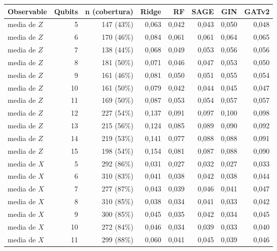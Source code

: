 \begin{table}[htbp]
    \centering
    {\footnotesize
    \begin{tabular}{@{}lrrrrrrr@{}}
        \toprule
        \textbf{Observable} & \textbf{Qubits} & \textbf{n (cobertura)} & \textbf{Ridge} & \textbf{RF} & \textbf{SAGE} & \textbf{GIN} & \textbf{GATv2} \\
        \midrule
        media de $Z$ & 5 & 147 (43\%) & 0,063 & 0,042 & 0,043 & 0,050 & 0,048 \\
        media de $Z$ & 6 & 170 (46\%) & 0,084 & 0,061 & 0,061 & 0,064 & 0,065 \\
        media de $Z$ & 7 & 138 (44\%) & 0,068 & 0,049 & 0,053 & 0,056 & 0,056 \\
        media de $Z$ & 8 & 181 (50\%) & 0,071 & 0,046 & 0,047 & 0,053 & 0,050 \\
        media de $Z$ & 9 & 161 (46\%) & 0,081 & 0,050 & 0,051 & 0,055 & 0,054 \\
        media de $Z$ & 10 & 161 (50\%) & 0,079 & 0,042 & 0,044 & 0,045 & 0,047 \\
        media de $Z$ & 11 & 169 (50\%) & 0,087 & 0,053 & 0,054 & 0,057 & 0,057 \\
        media de $Z$ & 12 & 227 (54\%) & 0,137 & 0,091 & 0,097 & 0,100 & 0,098 \\
        media de $Z$ & 13 & 215 (56\%) & 0,124 & 0,085 & 0,089 & 0,090 & 0,092 \\
        media de $Z$ & 14 & 219 (53\%) & 0,141 & 0,077 & 0,088 & 0,088 & 0,091 \\
        media de $Z$ & 15 & 198 (54\%) & 0,154 & 0,081 & 0,087 & 0,088 & 0,090 \\
        media de $X$ & 5 & 292 (86\%) & 0,031 & 0,027 & 0,032 & 0,027 & 0,033 \\
        media de $X$ & 6 & 310 (83\%) & 0,041 & 0,038 & 0,042 & 0,038 & 0,044 \\
        media de $X$ & 7 & 277 (87\%) & 0,043 & 0,039 & 0,046 & 0,041 & 0,047 \\
        media de $X$ & 8 & 310 (85\%) & 0,038 & 0,034 & 0,041 & 0,033 & 0,042 \\
        media de $X$ & 9 & 300 (85\%) & 0,045 & 0,035 & 0,042 & 0,034 & 0,045 \\
        media de $X$ & 10 & 272 (84\%) & 0,046 & 0,034 & 0,039 & 0,033 & 0,040 \\
        media de $X$ & 11 & 299 (88\%) & 0,060 & 0,041 & 0,045 & 0,039 & 0,046 \\

\end{tabular}}
\end{table}
